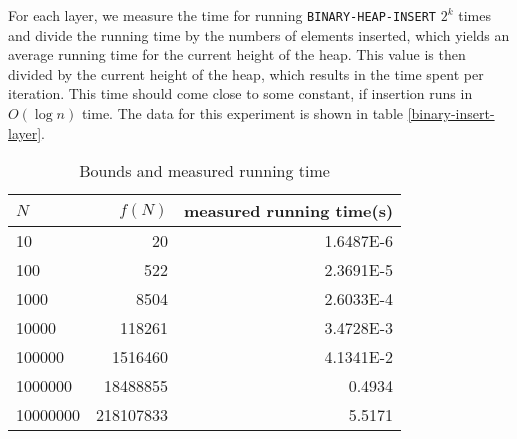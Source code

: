 \documentclass[a4paper,10pt]{article}
\begin{document}
For each layer, we measure the time for running \texttt{BINARY-HEAP-INSERT} $2^k$ times and divide the running time by the numbers of elements inserted, which yields an average running time for the current height of the heap. This value is then divided by the current height of the heap, which results in the time spent per iteration. This time should come close to some constant, if insertion runs in $O(\log n)$ time.
The data for this experiment is shown in table \ref{binary-insert-layer}.
\begin{table}
  \begin{center}
    \begin{tabular}{l|r|r}
      $N$ & $f(N)$ & measured running time(s) \\
      \hline
      10       & 20         & \num{1.6487E-6}\\
      100      & 522        & \num{2.3691E-5}\\
      1000     & 8504       & \num{2.6033E-4}\\
      10000    & 118261     & \num{3.4728E-3}\\
      100000   & 1516460    & \num{4.1341E-2}\\
      1000000  & 18488855   & \num{0.4934}\\
      10000000 & 218107833  & \num{5.5171}
    \end{tabular}
    \caption{Bounds and measured running time}
    \label{binary-insert-accumulative}
  \end{center}
\end{table}
\end{document}
